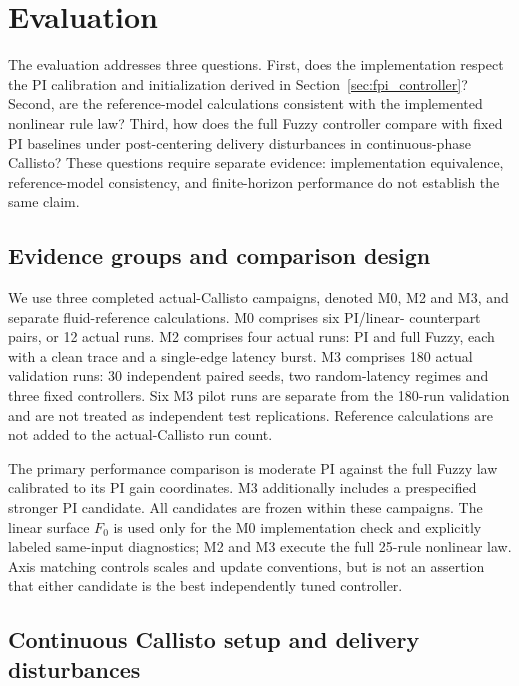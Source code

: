 \section{Evaluation}
\label{sec:evaluation}

The evaluation addresses three questions. First, does the implementation
respect the PI calibration and initialization derived in
Section~\ref{sec:fpi_controller}? Second, are the reference-model
calculations consistent with the implemented nonlinear rule law? Third,
how does the full Fuzzy controller compare with fixed PI baselines under
post-centering delivery disturbances in continuous-phase Callisto?
These questions require separate evidence: implementation equivalence,
reference-model consistency, and finite-horizon performance do not
establish the same claim.

\subsection{Evidence groups and comparison design}
\label{subsec:eval_design}

We use three completed actual-Callisto campaigns, denoted M0, M2 and M3,
and separate fluid-reference calculations. M0 comprises six PI/linear-
counterpart pairs, or 12 actual runs. M2 comprises four actual runs:
PI and full Fuzzy, each with a clean trace and a single-edge latency
burst. M3 comprises 180 actual validation runs: 30 independent paired
seeds, two random-latency regimes and three fixed controllers. Six M3
pilot runs are separate from the 180-run validation and are not treated
as independent test replications. Reference calculations are not added
to the actual-Callisto run count.

The primary performance comparison is moderate PI against the full
Fuzzy law calibrated to its PI gain coordinates. M3 additionally includes
a prespecified stronger PI candidate. All candidates are frozen within
these campaigns. The linear surface $F_0$ is used only for the M0
implementation check and explicitly labeled same-input diagnostics;
M2 and M3 execute the full 25-rule nonlinear law. Axis matching controls
scales and update conventions, but is not an assertion that either
candidate is the best independently tuned controller.

\subsection{Continuous Callisto setup and delivery disturbances}

